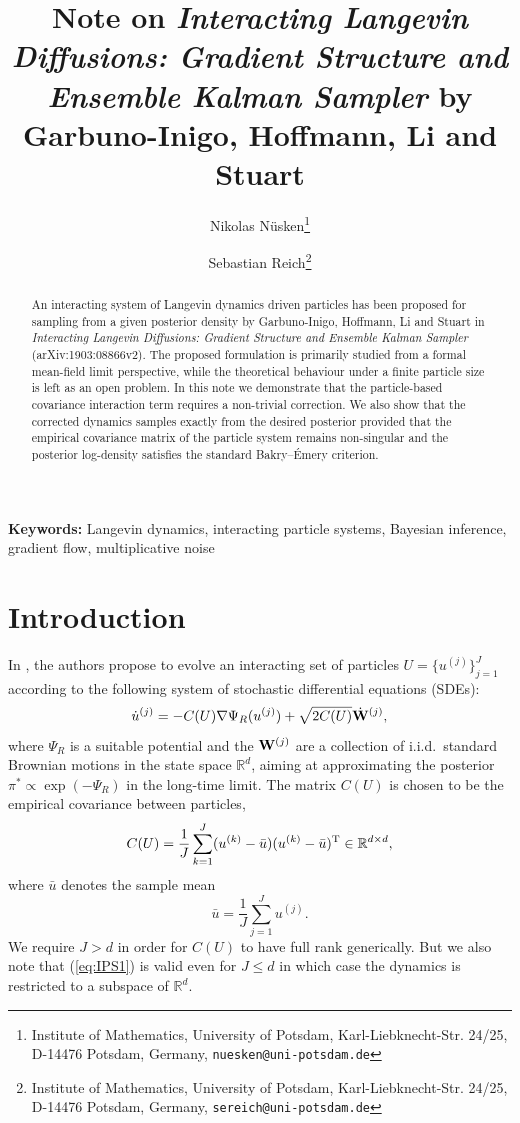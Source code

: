 \documentclass[11pt]{article}
\title{Note on {\it Interacting Langevin Diffusions: Gradient Structure and Ensemble Kalman Sampler} by 
Garbuno-Inigo, Hoffmann, Li and Stuart}
\author{Nikolas N\"usken\thanks{Institute of Mathematics, University of Potsdam, Karl-Liebknecht-Str. 24/25, D-14476 Potsdam, Germany, 
{\tt nuesken@uni-potsdam.de}} \and Sebastian Reich\thanks{
Institute of Mathematics, University of Potsdam, Karl-Liebknecht-Str. 24/25, D-14476 Potsdam, Germany, {\tt sereich@uni-potsdam.de}
}
}
\begin{document}
\maketitle


\begin{abstract}
An interacting system of Langevin dynamics driven particles has been proposed for sampling from a given posterior density
by Garbuno-Inigo, Hoffmann, Li and Stuart in {\it Interacting Langevin Diffusions: Gradient Structure and Ensemble Kalman Sampler}
(arXiv:1903:08866v2). The proposed formulation is primarily studied from a formal mean-field limit perspective, while the theoretical 
behaviour under a finite particle size is left as an open problem.  In this note we demonstrate that the particle-based covariance interaction term 
requires a non-trivial correction. We also show that the corrected dynamics samples exactly from the
desired posterior provided that the empirical covariance matrix of the particle system remains non-singular and the posterior log-density 
satisfies the standard Bakry--{\'E}mery criterion.
\end{abstract}

\noindent
{\bf Keywords:} Langevin dynamics, interacting particle systems, Bayesian inference, gradient flow, multiplicative noise

\section{Introduction}
In \cite{sr:GIHLS19}, the authors propose to evolve an interacting set of particles $U = \{u^{(j)}\}_{j=1}^J$ according to the following system
of stochastic differential equations (SDEs):
\begin{equation} \label{eq:IPS1}
\dot{u}^{(j)} = -C(U)\nabla \Psi_R(u^{(j)}) + \sqrt{2C(U)} \dot{\bf W}^{(j)},
\end{equation}
where $\Psi_R$ is a suitable potential and the ${\bf W}^{(j)}$ are a collection of i.i.d.~standard Brownian motions in the state space
$\mathbb{R}^d$, aiming at approximating the posterior $\pi^\ast \propto \exp(-\Psi_R)$ in the long-time limit. The matrix $C(U)$ is chosen to be the empirical covariance between particles,
\begin{equation}
C(U) = \frac{1}{J} \sum_{k=1}^J (u^{(k)}-\bar{u})(u^{(k)}-\bar u)^{\rm T} \in \mathbb{R}^{d\times d},
\end{equation}
where $\bar u$ denotes the sample mean
\begin{equation}
\bar u = \frac{1}{J}\sum_{j=1}^J u^{(j)}.
\end{equation}
We require $J>d$ in order for $C(U)$ to have full rank generically. But we also note that (\ref{eq:IPS1}) is valid
even for $J\le d$ in which case the dynamics is restricted to a subspace of $\mathbb{R}^d$.
 
\end{document}

